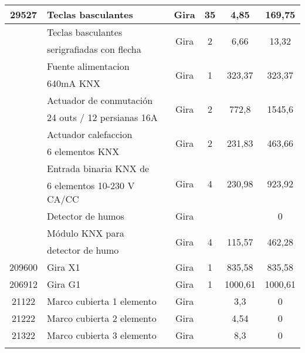 \begin{flushleft}
\begin{longtable}[H]{|c|p{4cm}|c|c|c|c|}
\hline
\rule[0mm]{0mm}{4mm}
29527 & Teclas basculantes & Gira & 35 & 4,85 & 169,75\\
\hline
\rule[0mm]{0mm}{4mm}
 \multirow{2}{*}{29427} & Teclas basculantes &  \multirow{2}{*}{Gira} &  \multirow{2}{*}{2} &  \multirow{2}{*}{6,66} &  \multirow{2}{*}{13,32}\\
 &  serigrafiadas con flecha & & & &\\
\hline
\rule[0mm]{0mm}{4mm}
\multirow{2}{*}{213000} & Fuente alimentacion& \multirow{2}{*}{Gira} & \multirow{2}{*}{1} & \multirow{2}{*}{323,37} & \multirow{2}{*}{323,37}\\
 &   640mA KNX  & & & &\\
\hline
\rule[0mm]{0mm}{4mm}
 \multirow{2}{*}{504000} & Actuador de conmutación &  \multirow{2}{*}{Gira} &  \multirow{2}{*}{2} &  \multirow{2}{*}{772,8} &  \multirow{2}{*}{1545,6}\\
 &  24 outs / 12 persianas 16A & & & &\\
\hline
\rule[0mm]{0mm}{4mm}
\multirow{2}{*}{212900} & Actuador calefaccion  & \multirow{2}{*}{Gira} & \multirow{2}{*}{2} & \multirow{2}{*}{231,83} & \multirow{2}{*}{463,66}\\
 & 6 elementos KNX & & & &\\
\hline
\rule[0mm]{0mm}{4mm}
 \multirow{2}{*}{212600} & Entrada binaria KNX de  &  \multirow{2}{*}{Gira} &  \multirow{2}{*}{4} &  \multirow{2}{*}{230,98} &  \multirow{2}{*}{923,92}\\
 & 6 elementos 10-230 V CA/CC & & & &\\
\hline
\rule[0mm]{0mm}{4mm}
 & Detector de humos & Gira &  &  & 0\\
\hline
\rule[0mm]{0mm}{4mm}
\multirow{2}{*}{234300} & Módulo KNX para  & \multirow{2}{*}{Gira} & \multirow{2}{*}{4} & \multirow{2}{*}{115,57} & \multirow{2}{*}{462,28}\\
 & detector de humo & & & &\\
\hline
\rule[0mm]{0mm}{4mm}
209600 & Gira X1 & Gira & 1 & 835,58 & 835,58\\
\hline
\rule[0mm]{0mm}{4mm}
206912 & Gira G1 & Gira & 1 & 1000,61 & 1000,61\\
\hline
\rule[0mm]{0mm}{4mm}
21122 & Marco cubierta 1 elemento & Gira &  & 3,3 & 0\\
\hline
\rule[0mm]{0mm}{4mm}
21222 & Marco cubierta 2 elemento & Gira &  & 4,54 & 0\\
\hline
\rule[0mm]{0mm}{4mm}
21322 & Marco cubierta 3 elemento & Gira &  & 8,3 & 0\\
\hline
\rule[0mm]{0mm}{4mm}

\end{longtable}
\end{flushleft}
